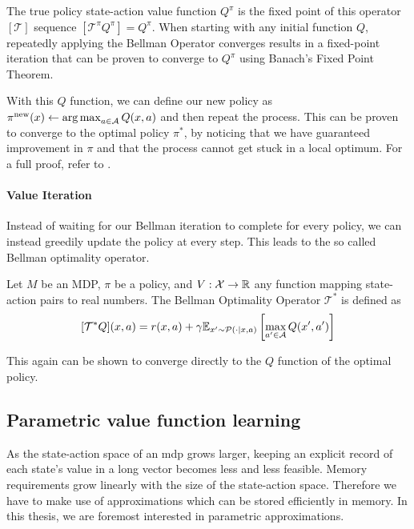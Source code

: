The true policy state-action value function $Q^\pi$ is the fixed point of this operator $[\mathcal{T}]$ sequence $[\mathcal{T}^\pi Q^\pi] = Q^\pi$.
When starting with any initial function $Q$, repeatedly applying the Bellman Operator converges results in a fixed-point iteration that can be proven to converge to $Q^\pi$ using Banach's Fixed Point Theorem.

With this $Q$ function, we can define our new policy as $\pi^\mathrm{new}(x) \leftarrow \operatorname*{arg\,max}_{a\in\mathcal{A}} Q(x,a)$ and then repeat the process.
This can be proven to converge to the optimal policy $\pi^*$, by noticing that we have guaranteed improvement in $\pi$ and that the process cannot get stuck in a local optimum.
For a full proof, refer to \textcite{farahmand2021}.

\paragraph{Value Iteration}

Instead of waiting for our Bellman iteration to complete for every policy, we can instead greedily update the policy at every step.
This leads to the so called Bellman optimality operator.

\begin{definition}
    Let $M$ be an MDP, $\pi$ be a policy, and $V: \mathcal{X} \rightarrow \mathbb{R}$ any function mapping state-action pairs to real numbers.
    The Bellman Optimality Operator $\mathcal{T}^*$ is defined as
    $$[\mathcal{T}^* Q](x,a) = r(x,a) + \gamma \mathbb{E}_{x'\sim \mathcal{P}(\cdot|x,a)}\left[\max_{a' \in \mathcal{A}}Q(x',a')\right]$$
\end{definition}

This again can be shown to converge directly to the $Q$ function of the optimal policy.

\subsection{Parametric value function learning}

As the state-action space of an \ac{mdp} grows larger, keeping an explicit record of each state's value in a long vector becomes less and less feasible.
Memory requirements grow linearly with the size of the state-action space.
Therefore we have to make use of approximations which can be stored efficiently in memory.
In this thesis, we are foremost interested in parametric approximations.

